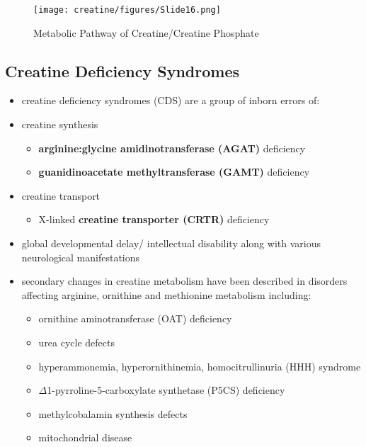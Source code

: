\documentclass[12pt]{scrartcl}
\begin{document}
\begin{figure}[htbp]
\centering
\texttt{[image: creatine/figures/Slide16.png]}
\caption{\label{fig:orgbdb43a2}Metabolic Pathway of Creatine/Creatine Phosphate}
\end{figure}

\subsection{Creatine Deficiency Syndromes}
\label{sec:orgfa8d974}
\begin{itemize}
\item creatine deficiency syndromes (CDS) are a group of inborn errors of:
\item creatine synthesis
\begin{itemize}
\item \textbf{arginine:glycine amidinotransferase (AGAT)} deficiency
\item \textbf{guanidinoacetate methyltransferase (GAMT)} deficiency
\end{itemize}
\item creatine transport
\begin{itemize}
\item X-linked \textbf{creatine transporter (CRTR)} deficiency
\end{itemize}
\item global developmental delay/ intellectual disability along with
various neurological manifestations

\item secondary changes in creatine metabolism have been described in
disorders affecting arginine, ornithine and methionine metabolism including:
\begin{itemize}
\item ornithine aminotransferase (OAT) deficiency
\item urea cycle defects
\item hyperammonemia, hyperornithinemia, homocitrullinuria (HHH) syndrome
\item \(\Delta\)1-pyrroline-5-carboxylate synthetase (P5CS) deficiency
\item methylcobalamin synthesis defects
\item mitochondrial disease
\end{itemize}
\end{itemize}
\end{document}

